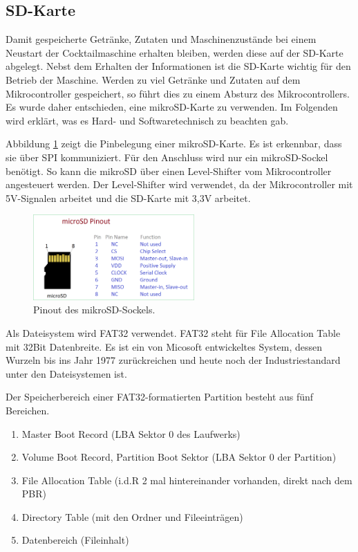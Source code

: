 \subsection{SD-Karte}
\label{subsec:SD-Karte}

Damit gespeicherte Getränke, Zutaten und Maschinenzustände bei einem Neustart der Cocktailmaschine erhalten bleiben, werden diese auf der SD-Karte abgelegt. Nebst dem Erhalten der Informationen ist die SD-Karte wichtig für den Betrieb der Maschine. Werden zu viel Getränke und Zutaten auf dem Mikrocontroller gespeichert, so führt dies zu einem Absturz des Mikrocontrollers. Es wurde daher entschieden, eine mikroSD-Karte zu verwenden. Im Folgenden wird erklärt, was es Hard- und Softwaretechnisch zu beachten gab.

Abbildung \ref{fig:micro_sd_pinout} zeigt die Pinbelegung einer mikroSD-Karte. Es ist erkennbar, dass sie über SPI kommuniziert. Für den Anschluss wird nur ein mikroSD-Sockel benötigt. So kann die mikroSD über einen Level-Shifter vom Mikrocontroller angesteuert werden. Der Level-Shifter wird verwendet, da der Mikrocontroller mit 5V-Signalen arbeitet und die SD-Karte mit 3,3V arbeitet.

\begin{figure}[H]
	\centering
	\includegraphics[width=0.55\textwidth]{graphics/micro-sd-pinout}
	\caption{Pinout des mikroSD-Sockels. \cite{theorycircuitcom_arduino_2018}}
	\label{fig:micro_sd_pinout}
\end{figure}

Als Dateisystem wird FAT32 verwendet. FAT32 steht für File Allocation Table mit 32Bit Datenbreite. Es ist ein von Micosoft entwickeltes System, dessen Wurzeln bis ins Jahr 1977 zurückreichen und heute noch der Industriestandard unter den Dateisystemen ist. \cite{ionosde_fat32_2020}

Der Speicherbereich einer FAT32-formatierten Partition besteht aus fünf Bereichen. \cite{milsch_aufbau_2009}
\begin{enumerate}
\item Master Boot Record (LBA Sektor 0 des Laufwerks)
\item Volume Boot Record, Partition Boot Sektor (LBA Sektor 0 der Partition)
\item File Allocation Table (i.d.R 2 mal hintereinander vorhanden, direkt nach dem PBR)
\item Directory Table (mit den Ordner und Fileeinträgen)
\item Datenbereich (Fileinhalt)
\end{enumerate}

